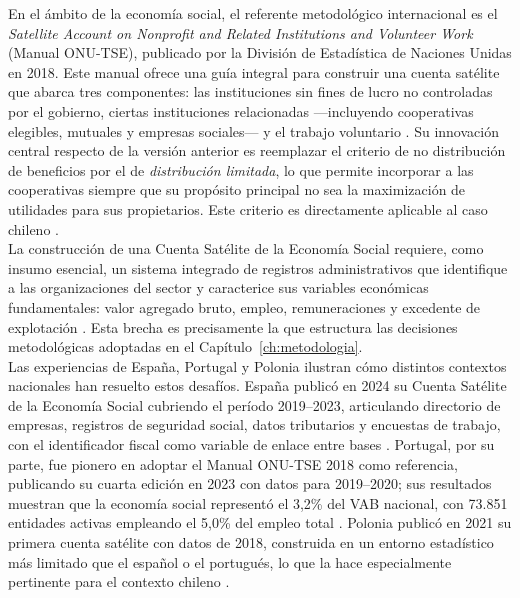 En el ámbito de la economía social, el referente metodológico internacional es 
el \textit{Satellite Account on Nonprofit and Related Institutions and Volunteer 
Work} (Manual ONU-TSE), publicado por la División de Estadística de Naciones 
Unidas en 2018. Este manual ofrece una guía integral para construir una cuenta 
satélite que abarca tres componentes: las instituciones sin fines de lucro no 
controladas por el gobierno, ciertas instituciones relacionadas ---incluyendo 
cooperativas elegibles, mutuales y empresas sociales--- y el trabajo voluntario 
\cite{vereinte_nationen_satellite_2018}. Su innovación central respecto de la versión 
anterior es reemplazar el criterio de no distribución de beneficios por el de 
\textit{distribución limitada}, lo que permite incorporar a las cooperativas siempre 
que su propósito principal no sea la maximización de utilidades para sus propietarios.
Este criterio es directamente aplicable al caso chileno \cite{barea_tejeiro_manual_2007}.\\

La construcción de una Cuenta Satélite de la Economía Social requiere, como insumo 
esencial, un sistema integrado de registros administrativos que identifique a las 
organizaciones del sector y caracterice sus variables económicas fundamentales: 
valor agregado bruto, empleo, remuneraciones y excedente de explotación 
\cite{vereinte_nationen_satellite_2018}. Esta brecha es precisamente la que estructura 
las decisiones metodológicas adoptadas en el Capítulo~\ref{ch:metodologia}.\\

Las experiencias de España, Portugal y Polonia ilustran cómo distintos contextos 
nacionales han resuelto estos desafíos. España publicó en 2024 su Cuenta Satélite 
de la Economía Social cubriendo el período 2019--2023, articulando directorio de 
empresas, registros de seguridad social, datos tributarios y encuestas de trabajo, 
con el identificador fiscal como variable de enlace entre bases 
\cite{noauthor_cuenta_2024}. Portugal, por su parte, fue pionero en adoptar el 
Manual ONU-TSE 2018 como referencia, publicando su cuarta edición en 2023 con 
datos para 2019--2020; sus resultados muestran que la economía social representó 
el 3,2\% del VAB nacional, con 73.851 entidades activas empleando el 5,0\% del 
empleo total . Polonia publicó en 2021 su primera cuenta 
satélite con datos de 2018, construida en un entorno estadístico más limitado que 
el español o el portugués, lo que la hace especialmente pertinente para el contexto 
chileno \cite{statistics_poland_social_2021}.\\


